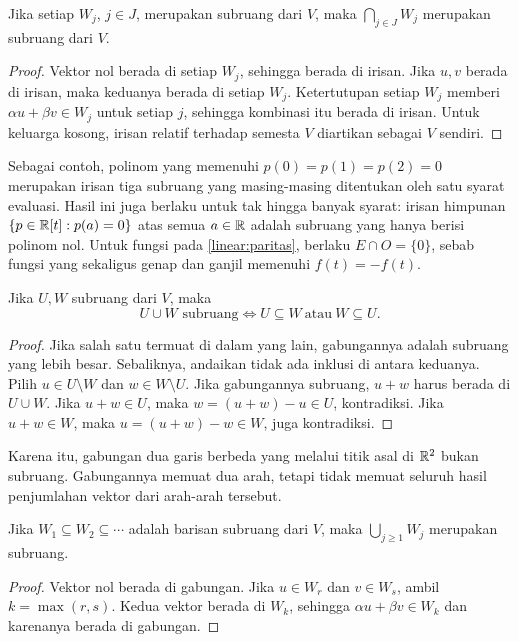\begin{teorema}
    Jika setiap $W_j$, $j\in J$, merupakan subruang dari $V$,
    maka $\bigcap_{j\in J}W_j$ merupakan subruang dari $V$.
\end{teorema}
\begin{proof}
    Vektor nol berada di setiap $W_j$, sehingga berada di irisan.
    Jika $u,v$ berada di irisan, maka keduanya berada di setiap
    $W_j$. Ketertutupan setiap $W_j$ memberi
    $\alpha u+\beta v\in W_j$ untuk setiap $j$, sehingga kombinasi
    itu berada di irisan. Untuk keluarga kosong, irisan relatif
    terhadap semesta $V$ diartikan sebagai $V$ sendiri.
\end{proof}

Sebagai contoh, polinom yang memenuhi $p(0)=p(1)=p(2)=0$
merupakan irisan tiga subruang yang masing-masing ditentukan
oleh satu syarat evaluasi. Hasil ini juga berlaku untuk tak hingga
banyak syarat: irisan himpunan $\{p\in\mathbb{R}[t]:p(a)=0\}$ atas
semua $a\in\mathbb{R}$ adalah subruang yang hanya berisi polinom nol.
Untuk fungsi pada \autoref{linear:paritas}, berlaku $E\cap O=\{0\}$,
sebab fungsi yang sekaligus genap dan ganjil memenuhi $f(t)=-f(t)$.

\begin{teorema}
    Jika $U,W$ subruang dari $V$, maka
    \[
        U\cup W\text{ subruang}
        \iff U\subseteq W\ \text{atau}\ W\subseteq U.
    \]
\end{teorema}
\begin{proof}
    Jika salah satu termuat di dalam yang lain, gabungannya adalah
    subruang yang lebih besar.
    Sebaliknya, andaikan tidak ada inklusi di antara keduanya.
    Pilih $u\in U\setminus W$ dan $w\in W\setminus U$.
    Jika gabungannya subruang, $u+w$ harus berada di $U\cup W$.
    Jika $u+w\in U$, maka $w=(u+w)-u\in U$, kontradiksi.
    Jika $u+w\in W$, maka $u=(u+w)-w\in W$, juga kontradiksi.
\end{proof}

Karena itu, gabungan dua garis berbeda yang melalui titik asal
di $\mathbb{R}^2$ bukan subruang. Gabungannya memuat dua arah, tetapi
tidak memuat seluruh hasil penjumlahan vektor dari arah-arah tersebut.

\begin{prop}
    \label{linear:rantai}
    Jika $W_1\subseteq W_2\subseteq\cdots$ adalah barisan
    subruang dari $V$, maka $\bigcup_{j\ge1}W_j$ merupakan subruang.
\end{prop}
\begin{proof}
    Vektor nol berada di gabungan. Jika $u\in W_r$ dan $v\in W_s$,
    ambil $k=\max(r,s)$. Kedua vektor berada di $W_k$, sehingga
    $\alpha u+\beta v\in W_k$ dan karenanya berada di gabungan.
\end{proof}

